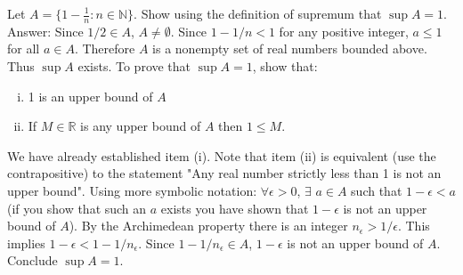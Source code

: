 \documentclass{article}
\begin{document}
Let $A = \{1-\frac{1}{n} : n \in \mathbb{N} \}$. Show using the definition of supremum that $\sup A = 1$. \\

Answer: Since $1/2 \in A$, $A \neq \emptyset$. Since $1-1/n < 1$ for any positive integer, $a \leq 1$ for all $a \in A$. Therefore $A$ is a nonempty set of real numbers bounded above. Thus $\sup A$ exists. To prove that $\sup A = 1$, show that:

\begin{enumerate}[(i)]
\item 1 is an upper bound of $A$
\item If $M \in \mathbb{R}$ is any upper bound of $A$ then $1 \leq M$.
\end{enumerate}

We have already established item (i). Note that item (ii) is equivalent (use the contrapositive) to the statement "Any real number strictly less than 1 is not an upper bound". Using more symbolic notation: $\forall \epsilon >0 $, $\exists$ $a \in A$ such that $1-\epsilon < a$ (if you show that such an $a$ exists you have shown that $1-\epsilon$ is not an upper bound of $A$). By the Archimedean property there is an integer $n_\epsilon > 1/\epsilon$. This implies $1-\epsilon < 1-1/n_\epsilon$. Since $1-1/n_\epsilon \in A$, $1-\epsilon$ is not an upper bound of $A$. Conclude $\sup A = 1$. 
\end{document}
